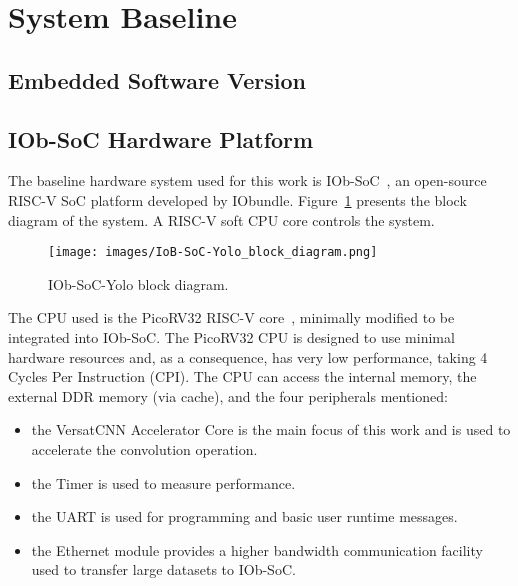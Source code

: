 \section{System Baseline}
\label{sec:sys_baseline}

\subsection{Embedded Software Version}
\label{section:embedded_sw}

\subsection{IOb-SoC Hardware Platform}
\label{section:iob_soc}

The baseline hardware system used for this work is IOb-SoC~\cite{iob_soc_repo},
an open-source RISC-V SoC platform developed by IObundle.
Figure~\ref{fig:IOb-SoC_complete} presents the block diagram of the system. A
RISC-V soft CPU core controls the system.

\begin{figure}[!htb]
	\centering
	\texttt{[image: images/IoB-SoC-Yolo\_block\_diagram.png]}
	\caption{IOb-SoC-Yolo block diagram.}
	\label{fig:IOb-SoC_complete}
\end{figure}

The CPU used is the PicoRV32 RISC-V core~\cite{picorv_repo}, minimally modified
to be integrated into IOb-SoC. The PicoRV32 CPU is designed to use minimal
hardware resources and, as a consequence, has very low performance, taking 4
Cycles Per Instruction (CPI). The CPU can access the internal memory, the
external DDR memory (via cache), and the four peripherals mentioned:
\begin{itemize}
\item the VersatCNN Accelerator Core is the main focus of this work and is used
  to accelerate the convolution operation.
\item the Timer is used to measure performance.
\item the UART is used for programming and basic user runtime messages.
\item the Ethernet module provides a higher bandwidth communication facility
  used to transfer large datasets to IOb-SoC.
\end{itemize}

